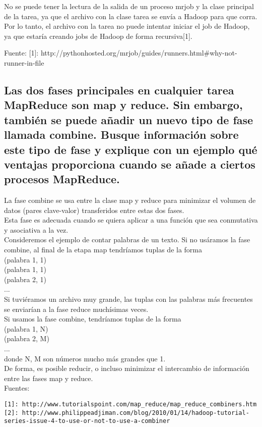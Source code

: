 \documentclass[12pt,a4paper,twoside,openright,titlepage,final]{article}
\begin{document}
No se puede tener la lectura de la salida de un proceso mrjob y la clase principal de la tarea, ya que el archivo con la clase tarea se envía a Hadoop para que corra. Por lo tanto, el archivo con la tarea no puede intentar iniciar el job de Hadoop, ya que estaría creando jobs de Hadoop de forma recursiva[1].

Fuente:
[1]: http://pythonhosted.org/mrjob/guides/runners.html\#why-not-runner-in-file

\subsection{Las dos fases principales en cualquier tarea MapReduce son map y reduce. Sin embargo, también se puede añadir un nuevo tipo de fase llamada combine. Busque información sobre este tipo de fase y explique con un ejemplo qué ventajas proporciona cuando se añade a ciertos procesos MapReduce.}

La fase combine se usa entre la clase map y reduce para minimizar el volumen de datos (pares clave-valor) transferidos entre estas dos fases.\\

Esta fase es adecuada cuando se quiera aplicar a una función que sea conmutativa y asociativa a la vez.\\

Consideremos el ejemplo de contar palabras de un texto. Si no usáramos la fase combine, al final de la etapa map tendríamos tuplas de la forma \\
(palabra 1, 1)\\
(palabra 1, 1)\\
(palabra 2, 1)\\
...\\


Si tuviéramos un archivo muy grande, las tuplas con las palabras más frecuentes se enviarían a la fase reduce muchísimas veces.\\

Si usamos la fase combine, tendríamos tuplas de la forma\\
(palabra 1, N)\\
(palabra 2, M)\\
...\\

donde N, M son números mucho más grandes que 1.\\

De forma, es posible reducir, o incluso minimizar el intercambio de información entre las fases map y reduce.\\

Fuentes:

\begin{verbatim}
[1]: http://www.tutorialspoint.com/map_reduce/map_reduce_combiners.htm
[2]: http://www.philippeadjiman.com/blog/2010/01/14/hadoop-tutorial-series-issue-4-to-use-or-not-to-use-a-combiner
\end{verbatim}


 
\end{document}
